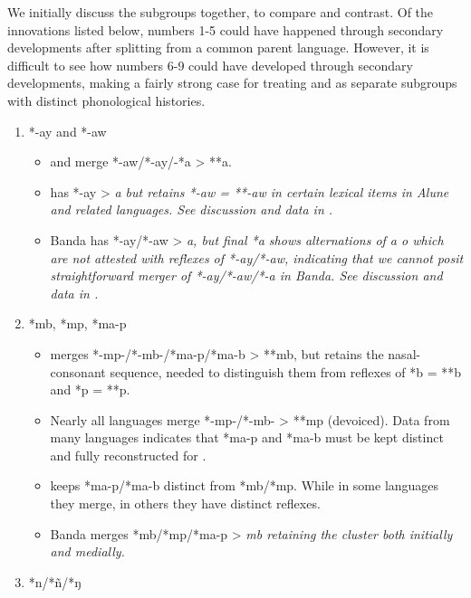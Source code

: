 We initially discuss the subgroups together,
to compare and contrast.
Of the innovations listed below,
numbers 1-5 could have happened through secondary developments
after splitting from a common parent language.
However, it is difficult to see how numbers 6-9 could have developed
through secondary developments, making a fairly strong case for treating 
and  as separate subgroups with distinct phonological
histories.

\begin{enumerate}
	\item	*-ay and *-aw
		\begin{itemize}[topsep=0pt,leftmargin=\dimexpr 15pt-6pt]	
			\item	{}
						and  merge *-aw/*-ay/-*a > **a.
			\item	{} has *-ay > \it{a} but retains *-aw = **-aw
						in certain lexical items in Alune and related languages.
						See discussion and data in .
			\item	Banda has *-ay/*-aw > \it{a,} but final *a shows alternations
						of \it{a {\tl} o} which are not attested with reflexes of *-ay/*-aw,
						indicating that we cannot posit straightforward merger of *-ay/*-aw/*-a in Banda.
						See  discussion
						and data in .
		\end{itemize}
	\item	*mb, *mp, *ma-p
		\begin{itemize}[topsep=0pt,leftmargin=\dimexpr 15pt-6pt]
			\item	{} merges *-mp-/*-mb-/*ma-p/*ma-b > **mb,
						but retains the nasal-consonant sequence,
						needed to distinguish them from reflexes of *b = **b
						and *p = **p.
			\item	Nearly all  languages merge *-mp-/*-mb- > **mp (devoiced).
						Data from many languages indicates that *ma-p
						and *ma-b must be kept distinct
						and fully reconstructed for .
			\item	{} keeps *ma-p/*ma-b distinct from *mb/*mp.
						While in some languages they merge,
						in others they have distinct reflexes.
			\item	Banda merges *mb/*mp/*ma-p > \it{mb} retaining the cluster
						both initially and medially. 
		\end{itemize}
	\item	*n/*ñ/*ŋ

\end{enumerate}
